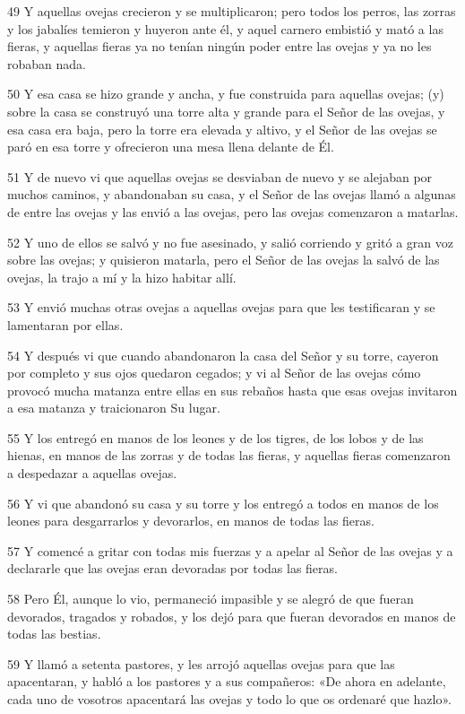 \par 49 Y aquellas ovejas crecieron y se multiplicaron; pero todos los perros, las zorras y los jabalíes temieron y huyeron ante él, y aquel carnero embistió y mató a las fieras, y aquellas fieras ya no tenían ningún poder entre las ovejas y ya no les robaban nada.
\par 50 Y esa casa se hizo grande y ancha, y fue construida para aquellas ovejas; (y) sobre la casa se construyó una torre alta y grande para el Señor de las ovejas, y esa casa era baja, pero la torre era elevada y altivo, y el Señor de las ovejas se paró en esa torre y ofrecieron una mesa llena delante de Él.
\par 51 Y de nuevo vi que aquellas ovejas se desviaban de nuevo y se alejaban por muchos caminos, y abandonaban su casa, y el Señor de las ovejas llamó a algunas de entre las ovejas y las envió a las ovejas, pero las ovejas comenzaron a matarlas.
\par 52 Y uno de ellos se salvó y no fue asesinado, y salió corriendo y gritó a gran voz sobre las ovejas; y quisieron matarla, pero el Señor de las ovejas la salvó de las ovejas, la trajo a mí y la hizo habitar allí.
\par 53 Y envió muchas otras ovejas a aquellas ovejas para que les testificaran y se lamentaran por ellas.
\par 54 Y después vi que cuando abandonaron la casa del Señor y su torre, cayeron por completo y sus ojos quedaron cegados; y vi al Señor de las ovejas cómo provocó mucha matanza entre ellas en sus rebaños hasta que esas ovejas invitaron a esa matanza y traicionaron Su lugar.
\par 55 Y los entregó en manos de los leones y de los tigres, de los lobos y de las hienas, en manos de las zorras y de todas las fieras, y aquellas fieras comenzaron a despedazar a aquellas ovejas.
\par 56 Y vi que abandonó su casa y su torre y los entregó a todos en manos de los leones para desgarrarlos y devorarlos, en manos de todas las fieras.
\par 57 Y comencé a gritar con todas mis fuerzas y a apelar al Señor de las ovejas y a declararle que las ovejas eran devoradas por todas las fieras.
\par 58 Pero Él, aunque lo vio, permaneció impasible y se alegró de que fueran devorados, tragados y robados, y los dejó para que fueran devorados en manos de todas las bestias.
\par 59 Y llamó a setenta pastores, y les arrojó aquellas ovejas para que las apacentaran, y habló a los pastores y a sus compañeros: «De ahora en adelante, cada uno de vosotros apacentará las ovejas y todo lo que os ordenaré que hazlo».
